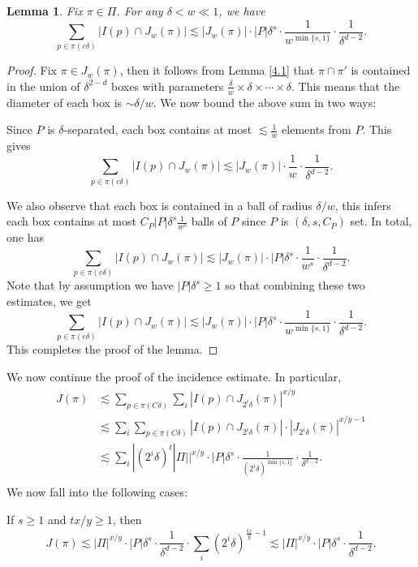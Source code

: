 \documentclass[11pt]{article}
\newtheorem{lemma}[theorem]{Lemma}
\newcommand{\1}{\mathbf{1}}
\begin{document}
\begin{lemma}\label{4.2}
    Fix $\pi\in \Pi$. For any $\delta<w\ll 1$, we have 
   \[\sum_{p\in \pi(c\delta)}|I(p)\cap J_{w}(\pi)|\lesssim |J_{w}(\pi)|\cdot |P|\delta^{s} \cdot \frac{1}{w^{\min\{s, 1\}}}\cdot \frac{1}{\delta^{d-2}}.\]
\end{lemma}
\begin{proof}
    Fix $\pi\in J_{w}(\pi)$, then it follows from Lemma \ref{4.1} that $\pi\cap \pi'$ is contained in the union of $\delta^{2-d}$ boxes with parameters $\frac{\delta}{w}\times \delta\times \cdots\times \delta$. This means that the diameter of each box is $\sim \delta/w$. We now bound the above sum in two ways:

Since $P$ is $\delta$-separated, each box contains at most $\lesssim \frac{1}{w}$ elements from $P$. This gives 
\[\sum_{p\in \pi(c\delta)}|I(p)\cap J_{w}(\pi)|\lesssim |J_{w}(\pi)|\cdot \frac{1}{w}\cdot \frac{1}{\delta^{d-2}}.\]

We also observe that each box is contained in a ball of radius $\delta/w$, this infers each box contains at most $C_P |P|\delta^{s}\frac{1}{w^s}$ balls of $P$ since $P$ is $(\delta, s, C_P)$ set. In total, one has 
\[\sum_{p\in \pi(c\delta)}|I(p)\cap J_{w}(\pi)|\lesssim |J_{w}(\pi)|\cdot |P|\delta^{s} \cdot \frac{1}{w^s}\cdot \frac{1}{\delta^{d-2}}.\]
Note that by assumption we have $|P|\delta^{s} \geq 1$ so that combining these two estimates, we get
\[\sum_{p\in \pi(c\delta)}|I(p)\cap J_{w}(\pi)|\lesssim |J_{w}(\pi)|\cdot |P|\delta^{s}\cdot  \frac{1}{w^{\min\{s, 1\}}}\cdot \frac{1}{\delta^{d-2}}.\]
This completes the proof of the lemma. 
\end{proof}
We now continue the proof of the incidence estimate. In particular,
\begin{align*}
    J(\pi) & \lesssim \sum_{p\in \pi(C\delta)}\sum_{i}|I(p)\cap J_{2^i\delta}(\pi)|^{x/y}\\
    &\lesssim  \sum_{i}\sum_{p\in \pi(C\delta)}|I(p)\cap J_{2^i\delta}(\pi)|\cdot |J_{2^i\delta}(\pi)|^{x/y-1}\\
    &\lesssim \sum_{i}|(2^i \delta)^t|\Pi||^{x/y }\cdot |P|\delta^{s} \cdot \frac{1}{(2^i\delta)^{\min\{s, 1\}}}\cdot \frac{1}{\delta^{d-2}}.\\
     \end{align*}
We now fall into the following cases:

If $s\ge 1$ and $tx/y\ge 1$, then 
\[J(\pi)\lesssim |\Pi|^{x/y} \cdot |P|\delta^{s} \cdot \frac{1}{\delta^{d-2}}\cdot \sum_{i}(2^i\delta)^{\frac{tx}{y}-1}\lesssim |\Pi|^{x/y} \cdot |P|\delta^{s} \cdot \frac{1}{\delta^{d-2}}.\]
\end{document}
